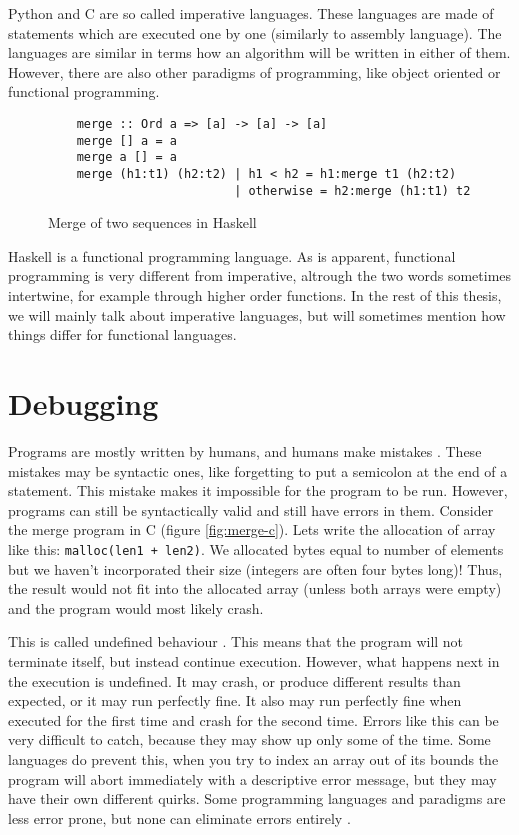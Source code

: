 Python and C are so called imperative languages. These languages are 
made of statements which are executed one by one (similarly to assembly language).
The languages are similar in terms how an algorithm will be written in either of them.
However, there are also other paradigms of programming, like object oriented or functional programming.

\begin{figure}[H]
    \begin{verbatim}
    merge :: Ord a => [a] -> [a] -> [a]
    merge [] a = a
    merge a [] = a
    merge (h1:t1) (h2:t2) | h1 < h2 = h1:merge t1 (h2:t2)
                          | otherwise = h2:merge (h1:t1) t2
    \end{verbatim}
    \caption{Merge of two sequences in Haskell}
\end{figure}

Haskell is a functional programming language. As is apparent, functional programming is very different from imperative,
altrough the two words sometimes intertwine, for example through higher order functions. In the rest of this thesis, we will
mainly talk about imperative languages, but will sometimes mention how things differ for functional languages.

\section{Debugging}
Programs are mostly written by humans, and humans make mistakes \cite{human-error}. These mistakes may be syntactic ones, like
forgetting to put a semicolon at the end of a statement. This mistake makes it impossible for the program to be run. However,
programs can still be syntactically valid and still have errors in them. Consider the merge program in C (figure \ref{fig:merge-c}).
Lets write the allocation of array like this: \texttt{malloc(len1 + len2)}. We allocated bytes equal to number of elements
but we haven't incorporated their size (integers are often four bytes long)! Thus, the result would not fit into the allocated
array (unless both arrays were empty) and the program would most likely crash.

This is called undefined behaviour \cite{undefined-behavior}. This means that the program will not terminate itself, but instead continue execution.
However, what happens next in the execution is undefined. It may crash, or produce different results than expected, or
it may run perfectly fine. It also may run perfectly fine when executed for the first time and crash for the second time.
Errors like this can be very difficult to catch, because they may show up only some of the time. Some languages do prevent this,
when you try to index an array out of its bounds the program will abort immediately with a descriptive error message,
but they may have their own different quirks. Some programming languages and paradigms are less error prone, but none 
can eliminate errors entirely \cite{bugs-by-language, bugs-by-language-2}.

